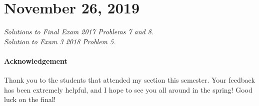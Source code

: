 \documentclass[11pt]{article}
\theoremstyle{plain}
\theoremstyle{definition}
\theoremstyle{remark}
\begin{document}
\section{November 26, 2019}

{\it Solutions to Final Exam 2017 Problems 7 and 8.}\\
{\it Solution to Exam 3 2018 Problem 5.}

\paragraph{Acknowledgement} Thank you to the students that attended my section this semester. Your feedback has been extremely helpful, and I hope to see you all around in the spring! Good luck on the final!

\newpage

\vspace{5mm}

%


\newpage
\end{document}
